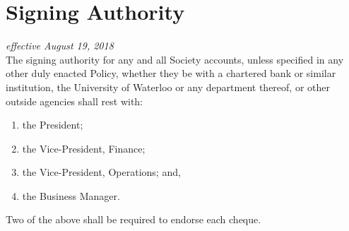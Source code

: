 \section{Signing Authority}
\emph{effective August 19, 2018}\\

The signing authority for any and all Society accounts, unless specified in any
other duly enacted Policy, whether they be with a chartered bank or similar
institution, the University of Waterloo or any department thereof, or other
outside agencies shall rest with:

\begin{enumerate}
    \item the President;
    \item the Vice-President, Finance;
    \item the Vice-President, Operations; and,
    \item the Business Manager.
\end{enumerate}
\noindent Two of the above shall be required to endorse each cheque.
